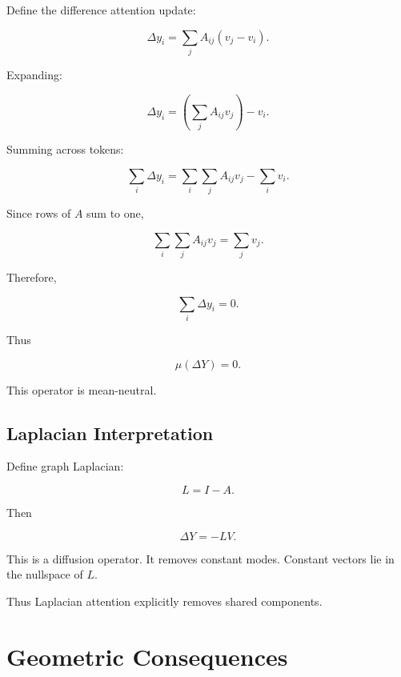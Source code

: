 Define the difference attention update:

\begin{equation}
\Delta y_i
=
\sum_j A_{ij}(v_j - v_i).
\end{equation}

Expanding:

\begin{equation}
\Delta y_i
=
\left(\sum_j A_{ij} v_j\right) - v_i.
\end{equation}

Summing across tokens:

\begin{equation}
\sum_i \Delta y_i
=
\sum_i \sum_j A_{ij} v_j
-
\sum_i v_i.
\end{equation}

Since rows of $A$ sum to one,

\begin{equation}
\sum_i \sum_j A_{ij} v_j
=
\sum_j v_j.
\end{equation}

Therefore,

\begin{equation}
\sum_i \Delta y_i = 0.
\end{equation}

Thus

\begin{equation}
\mu(\Delta Y) = 0.
\end{equation}

This operator is mean-neutral.

\subsection{Laplacian Interpretation}

Define graph Laplacian:

\begin{equation}
L = I - A.
\end{equation}

Then

\begin{equation}
\Delta Y = -L V.
\end{equation}

This is a diffusion operator.
It removes constant modes.
Constant vectors lie in the nullspace of $L$.

Thus Laplacian attention explicitly removes shared components.

\section{Geometric Consequences}

